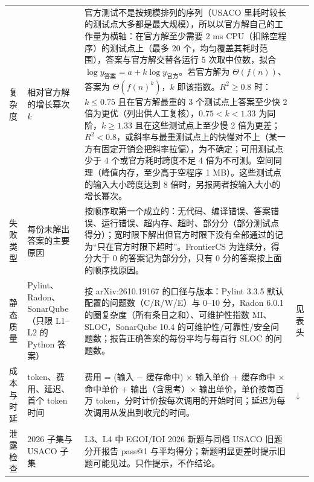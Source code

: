 \documentclass[11pt,a4paper,fontset=none]{ctexart}
\begin{document}
{\begin{longtable}{@{}p{1.6cm}p{2.6cm}p{9.9cm}p{1.2cm}@{}}
复杂度 & 相对官方解的增长幂次 $k$ & 官方测试不是按规模排列的序列（USACO 里耗时较长的测试点大多都是最大规模），所以以官方解自己的工作量为横轴：在官方解至少需要 2 ms CPU（扣除空程序）的测试点上（最多 20 个，均匀覆盖其耗时范围），答案与官方解交替各运行 5 次取中位数，拟合 $\log y_{\text{答案}} = a + k \log y_{\text{官方}}$。若官方解为 $\Theta(f(n))$、答案为 $\Theta(f(n)^k)$，$k$ 即该指数。$R^2 \ge 0.8$ 时：$k \le 0.75$ 且在官方解最重的 3 个测试点上答案至少快 2 倍为更优（列出供人工复核），$0.75 < k < 1.33$ 为同阶，$k \ge 1.33$ 且在这些测试点上至少慢 2 倍为更差；$R^2 < 0.8$，或斜率与最重测试点上的快慢对不上（某一方有固定开销会把斜率拉偏），为不确定；可用测试点少于 4 个或官方耗时跨度不足 4 倍为不可测。空间同理（峰值内存，至少高于空程序 1 MB）。这些测试点的输入大小跨度达到 8 倍时，另报两者按输入大小的增长幂次。 &  \\
失败类型 & 每份未解出答案的主要原因 & 按顺序取第一个成立的：无代码、编译错误、答案错误、运行错误、超内存、超时、部分分（部分测试点得分）；宽时限下解出但官方时限下没有全部通过的记为“只在官方时限下超时”。FrontierCS 为连续分，得分大于 0 的答案记为部分分，只有 0 分的答案按上面的顺序找原因。 &  \\
静态质量 & Pylint、Radon、SonarQube（只限 L1–L2 的 Python 答案） & 按 arXiv:2610.19167 的口径与版本：Pylint 3.3.5 默认配置的问题数（C/R/W/E）与 0–10 分，Radon 6.0.1 的圈复杂度（所有条目之和）、可维护性指数 MI、SLOC，SonarQube 10.4 的可维护性/可靠性/安全问题数；报告正确答案的每份平均与每百行 SLOC 的问题数。 & 见表头 \\
成本与时延 & token、费用、延迟、首个 token 时间 & 费用 = (输入 − 缓存命中) × 输入单价 + 缓存命中 × 命中单价 + 输出（含思考）× 输出单价，单价按每百万 token，分时计价按每次调用的开始时间；延迟为每次调用从发出到收完的时间。 & ↓ \\
泄露检查 & 2026 子集与 USACO 子集 & L3、L4 中 EGOI/IOI 2026 新题与同档 USACO 旧题分开报告 pass@1 与平均得分；新题明显更差时提示旧题可能见过。只作提示，不作结论。 &  \\
\bottomrule
\end{longtable}}
\end{document}
